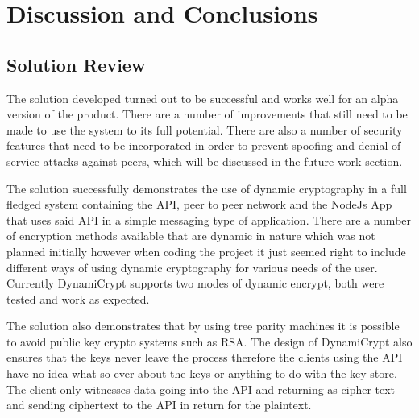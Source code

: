\chapter{Discussion and Conclusions}
\label{chap:conclusions}
%
%
\section{Solution Review}
The solution developed turned out to be successful and works well for an alpha version of the product. There are a number of improvements that still need to be made to use the system to its full potential. There are also a number of security features that need to be incorporated in order to prevent spoofing and denial of service attacks against peers, which will be discussed in the future work section.  

The solution successfully demonstrates the use of dynamic cryptography in a full fledged system containing the API, peer to peer network and the NodeJs App that uses said API in a simple messaging type of application. There are a number of encryption methods available that are dynamic in nature which was not planned initially however when coding the project it just seemed right to include different ways of using dynamic cryptography for various needs of the user. Currently DynamiCrypt supports two modes of dynamic encrypt, both were tested and work as expected.

The solution also demonstrates that by using tree parity machines it is possible to avoid public key crypto systems such as RSA. The design of DynamiCrypt also ensures that the keys never leave the process therefore the clients using the API have no idea what so ever about the keys or anything to do with the key store. The client only witnesses data going into the API and returning as cipher text and sending ciphertext to the API in return for the plaintext.


